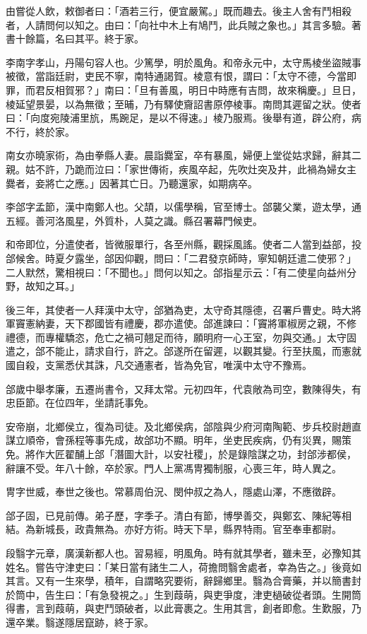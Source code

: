 \begin{pinyinscope}
由嘗從人飲，敕御者曰：「酒若三行，便宜嚴駕。」既而趣去。後主人舍有鬥相殺者，人請問何以知之。由曰：「向社中木上有鳩鬥，此兵賊之象也。」其言多驗。著書十餘篇，名曰其平。終于家。

李南字孝山，丹陽句容人也。少篤學，明於風角。和帝永元中，太守馬棱坐盜賊事被徵，當詣廷尉，吏民不寧，南特通謁賀。棱意有恨，謂曰：「太守不德，今當即罪，而君反相賀邪？」南曰：「旦有善風，明日中時應有吉問，故來稱慶。」旦日，棱延望景晏，以為無徵；至晡，乃有驛使齎詔書原停棱事。南問其遲留之狀。使者曰：「向度宛陵浦里斻，馬踠足，是以不得速。」棱乃服焉。後舉有道，辟公府，病不行，終於家。

南女亦曉家術，為由拳縣人妻。晨詣爨室，卒有暴風，婦便上堂從姑求歸，辭其二親。姑不許，乃跪而泣曰：「家世傳術，疾風卒起，先吹灶突及井，此禍為婦女主爨者，妾將亡之應。」因著其亡日。乃聽還家，如期病卒。

李郃字孟節，漢中南鄭人也。父頡，以儒學稱，官至博士。郃襲父業，遊太學，通五經。善河洛風星，外質朴，人莫之識。縣召署幕門候吏。

和帝即位，分遣使者，皆微服單行，各至州縣，觀採風謠。使者二人當到益部，投郃候舍。時夏夕露坐，郃因仰觀，問曰：「二君發京師時，寧知朝廷遣二使邪？」二人默然，驚相視曰：「不聞也。」問何以知之。郃指星示云：「有二使星向益州分野，故知之耳。」

後三年，其使者一人拜漢中太守，郃猶為吏，太守奇其隱德，召署戶曹史。時大將軍竇憲納妻，天下郡國皆有禮慶，郡亦遣使。郃進諫曰：「竇將軍椒房之親，不修禮德，而專權驕恣，危亡之禍可翹足而待，願明府一心王室，勿與交通。」太守固遣之，郃不能止，請求自行，許之。郃遂所在留遲，以觀其變。行至扶風，而憲就國自殺，支黨悉伏其誅，凡交通憲者，皆為免官，唯漢中太守不豫焉。

郃歲中舉孝廉，五遷尚書令，又拜太常。元初四年，代袁敞為司空，數陳得失，有忠臣節。在位四年，坐請託事免。

安帝崩，北鄉侯立，復為司徒。及北鄉侯病，郃陰與少府河南陶範、步兵校尉趙直謀立順帝，會孫程等事先成，故郃功不顯。明年，坐吏民疾病，仍有災異，賜策免。將作大匠翟酺上郃「潛圖大計，以安社稷」，於是錄陰謀之功，封郃涉都侯，辭讓不受。年八十餘，卒於家。門人上黨馮冑獨制服，心喪三年，時人異之。

冑字世威，奉世之後也。常慕周伯況、閔仲叔之為人，隱處山澤，不應徵辟。

郃子固，已見前傳。弟子歷，字季子。清白有節，博學善交，與鄭玄、陳紀等相結。為新城長，政貴無為。亦好方術。時天下旱，縣界特雨。官至奉車都尉。

段翳字元章，廣漢新都人也。習易經，明風角。時有就其學者，雖未至，必豫知其姓名。嘗告守津吏曰：「某日當有諸生二人，荷擔問翳舍處者，幸為告之。」後竟如其言。又有一生來學，積年，自謂略究要術，辭歸鄉里。翳為合膏藥，并以簡書封於筒中，告生曰：「有急發視之。」生到葭萌，與吏爭度，津吏檛破從者頭。生開筒得書，言到葭萌，與吏鬥頭破者，以此膏裹之。生用其言，創者即愈。生歎服，乃還卒業。翳遂隱居竄跡，終于家。


\end{pinyinscope}
